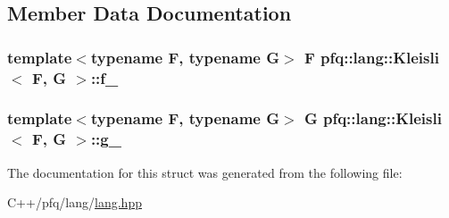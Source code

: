 \subsection{Member Data Documentation}
\subsubsection[{\texorpdfstring{f\+\_\+}{f_}}]{\setlength{\rightskip}{0pt plus 5cm}template$<$typename F, typename G$>$ F {\bf pfq\+::lang\+::\+Kleisli}$<$ F, G $>$\+::f\+\_\+}\hypertarget{structpfq_1_1lang_1_1Kleisli_a904b72f295e1a832136714faca8a5119}{}\label{structpfq_1_1lang_1_1Kleisli_a904b72f295e1a832136714faca8a5119}
\subsubsection[{\texorpdfstring{g\+\_\+}{g_}}]{\setlength{\rightskip}{0pt plus 5cm}template$<$typename F, typename G$>$ G {\bf pfq\+::lang\+::\+Kleisli}$<$ F, G $>$\+::g\+\_\+}\hypertarget{structpfq_1_1lang_1_1Kleisli_a29fe52c910805bb5d9582e1ee9a8b2ab}{}\label{structpfq_1_1lang_1_1Kleisli_a29fe52c910805bb5d9582e1ee9a8b2ab}


The documentation for this struct was generated from the following file\+:\begin{DoxyCompactItemize}
\item 
C++/pfq/lang/\hyperlink{lang_8hpp}{lang.\+hpp}\end{DoxyCompactItemize}
